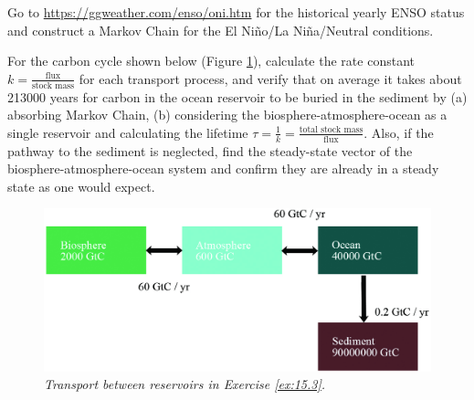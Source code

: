 \begin{Exercise}
Go to \href{https://ggweather.com/enso/oni.htm}{https://ggweather.com/enso/oni.htm} for the historical yearly ENSO status and construct a Markov Chain for the El Niño/La Niña/Neutral conditions.
\end{Exercise}

\begin{Exercise}
\label{ex:15.3}
For the carbon cycle shown below (Figure \ref{fig:ex15.3}), calculate the rate constant $k = \frac{\text{flux}}{\text{stock mass}}$ for each transport process, and verify that on average it takes about 213000 years for carbon in the ocean reservoir to be buried in the sediment by (a) absorbing Markov Chain, (b) considering the biosphere-atmosphere-ocean as a single reservoir and calculating the lifetime $\tau = \frac{1}{k} = \frac{\text{total stock mass}}{\text{flux}}$. Also, if the pathway to the sediment is neglected, find the steady-state vector of the biosphere-atmosphere-ocean system and confirm they are already in a steady state as one would expect.
\begin{figure}[ht!]
    \centering
    \includegraphics[scale = 1.1]{graphics/carboncycle.jpg}
    \caption{\textit{Transport between reservoirs in Exercise \ref{ex:15.3}.}}
    \label{fig:ex15.3}
\end{figure}
\end{Exercise}
